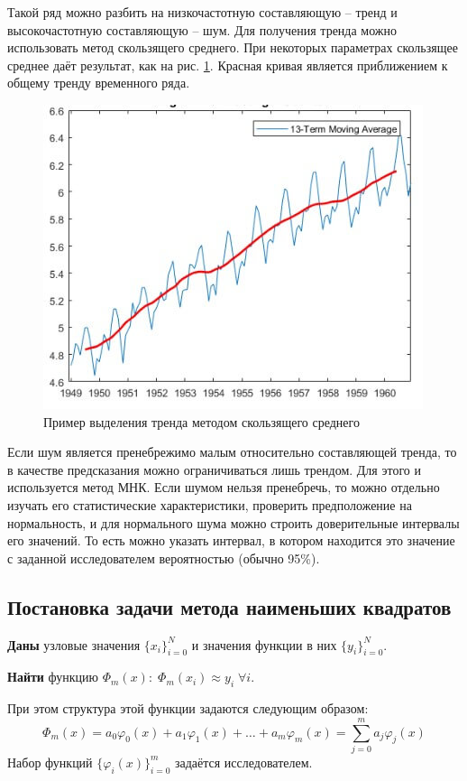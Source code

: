 	Такой ряд можно разбить на низкочастотную составляющую -- тренд и высокочастотную составляющую -- шум. Для получения тренда можно использовать метод скользящего среднего. При некоторых параметрах скользящее среднее даёт результат, как на рис. \ref{moveing_average}. Красная кривая является приближением к общему тренду временного ряда.
	
	\begin{figure}[h]
		\centering\includegraphics[width=.5\textwidth]{png/moving_average.jpg}
		\caption{Пример выделения тренда методом скользящего среднего}
		\label{moveing_average}
	\end{figure}

	Если шум является пренебрежимо малым относительно составляющей тренда, то в качестве предсказания можно ограничиваться лишь трендом. Для этого и используется метод МНК. Если шумом нельзя пренебречь, то можно отдельно изучать его статистические характеристики, проверить предположение на нормальность, и для нормального шума можно строить доверительные интервалы его значений. То есть можно указать интервал, в котором находится это значение с заданной исследователем вероятностью (обычно 95\%).
	
	\subsection{Постановка задачи метода наименьших квадратов}
	
	\textbf{Даны} узловые значения $\{x_i\}_{i=0}^N$ и значения функции в них $\{y_i\}_{i=0}^N$. 
	
	\textbf{Найти} функцию $\Phi_m(x):\;\Phi_m(x_i)\approx y_i \;\forall i$.
	
	При этом структура этой функции задаются следующим образом:
	\begin{equation*}
		\Phi_m(x) = a_0\varphi_0(x) + a_1\varphi_1(x) +\dots+a_m\varphi_m(x) = \sum_{j=0}^m a_j \varphi_j(x)
	\end{equation*}
	Набор функций $\{\varphi_i(x)\}_{i=0}^m$ задаётся исследователем.
	
